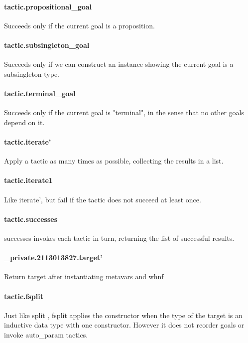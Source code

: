 \documentclass{article}
\begin{document}
\paragraph{tactic.propositional\_goal}
\par
Succeeds only if the current goal is a proposition.
\paragraph{tactic.subsingleton\_goal}
\par
Succeeds only if we can construct an instance showing the
current goal is a subsingleton type.
\paragraph{tactic.terminal\_goal}
\par
Succeeds only if the current goal is "terminal", in the sense
that no other goals depend on it.
\paragraph{tactic.iterate'}
\par
Apply a tactic as many times as possible, collecting the results in a list.
\paragraph{tactic.iterate1}
\par
Like iterate', but fail if the tactic does not succeed at least once.
\paragraph{tactic.successes}
\par
\colorbox[RGB]{253,246,227}{{{{\color[RGB]{101, 123, 131} successes }}}} invokes each tactic in turn, returning the list of successful results.
\paragraph{\_private.2113013827.target'}
\par
Return target after instantiating metavars and whnf
\paragraph{tactic.fsplit}
\par
Just like 
\colorbox[RGB]{253,246,227}{{{{\color[RGB]{101, 123, 131} split }}}}, 
\colorbox[RGB]{253,246,227}{{{{\color[RGB]{101, 123, 131} fsplit }}}} applies the constructor when the type of the target is an inductive data type with one constructor.
However it does not reorder goals or invoke 
\colorbox[RGB]{253,246,227}{{{{\color[RGB]{101, 123, 131} auto\_param }}}} tactics.
\end{document}
